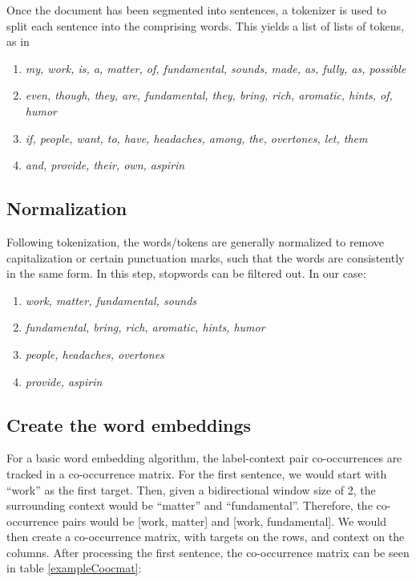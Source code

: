 Once the document has been segmented into sentences, a tokenizer is used to split each sentence into the comprising words. This yields a list of lists of tokens, as in
\begin{enumerate}
    \item \textit{my, work, is, a, matter, of, fundamental, sounds, made, as, fully, as, possible}
    \item \textit{even, though, they, are, fundamental, they, bring, rich, aromatic, hints, of, humor}
    \item \textit{if, people, want, to, have, headaches, among, the, overtones, let, them}
    \item \textit{and, provide, their, own, aspirin}
\end{enumerate}

\subsection{Normalization}

Following tokenization, the words/tokens are generally normalized to remove capitalization or certain punctuation marks, such that the words are consistently in the same form. In this step, stopwords can be filtered out. In our case:
\begin{enumerate}
    \item \textit{work, matter, fundamental, sounds}
    \item \textit{fundamental, bring, rich, aromatic, hints, humor}
    \item \textit{people, headaches, overtones}
    \item \textit{provide, aspirin}
\end{enumerate}

\subsection{Create the word embeddings}

For a  basic word embedding algorithm, the label-context pair co-occurrences are tracked in a co-occurrence matrix. For the first sentence, we would start with ``work'' as the first target. Then, given a bidirectional window size of 2, the surrounding context would be ``matter'' and ``fundamental''. Therefore, the co-occurrence pairs would be [work, matter] and [work, fundamental]. We would then create a co-occurrence matrix, with targets on the rows, and context on the columns.  After processing the first sentence, the co-occurrence matrix can be seen in table \ref{exampleCoocmat}:

